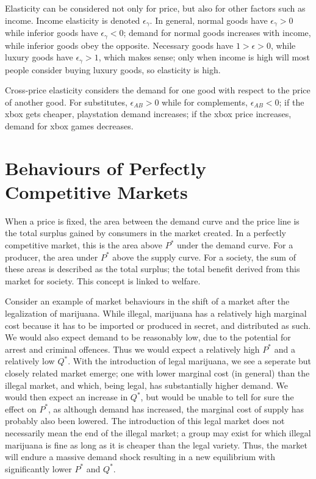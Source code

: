 \documentclass[12pt]{report}
\begin{document}
\begin{flushleft}
\bigskip
Elasticity can be considered not only for price, but also for other factors such as income. Income 
elasticity is denoted \(\epsilon_\gamma\). In general, normal goods have \(\epsilon_\gamma > 0\) while
inferior goods have \(\epsilon_\gamma < 0\); demand for normal goods increases with income, while inferior goods
obey the opposite. Necessary goods have \(1 > \epsilon > 0\), while luxury goods
have \(\epsilon_\gamma > 1\), which makes sense; only when income is high will most people consider buying
luxury goods, so elasticity is high.

\bigskip
Cross-price elasticity considers the demand for one good with respect to the price of another good. For
substitutes, \(\epsilon_{AB} > 0\) while for complements, \(\epsilon_{AB} < 0\); if the xbox gets 
cheaper, playstation demand increases; if the xbox price increases, demand for xbox games decreases.

\section*{Behaviours of Perfectly Competitive Markets}
When a price is fixed, the area between the demand curve and the price line is the total surplus gained
by consumers in the market created. In a perfectly competitive market, this is the area above \(P^*\) under
the demand curve. For a producer, the area under \(P^*\) above the supply curve. For a society, the sum of
these areas is described as the total surplus; the total benefit derived from this market for society. This
concept is linked to welfare.

\bigskip
Consider an example of market behaviours in the shift of a market after the legalization of marijuana.
While illegal, marijuana has a relatively high marginal cost because it has to be imported or produced 
in secret, and distributed as such. We would also expect demand to be reasonably low, due to the potential
for arrest and criminal offences. Thus we would expect a relatively high \(P^*\) and a relatively low \(Q^*\).
With the introduction of legal marijuana, we see a seperate but closely related market emerge; one with lower
marginal cost (in general) than the illegal market, and which, being legal, has substantially higher demand.
We would then expect an increase in \(Q^*\), but would be unable to tell for sure the effect on \(P^*\), as
although demand has increased, the marginal cost of supply has probably also been lowered. The introduction
of this legal market does not necessarily mean the end of the illegal market; a group may exist for which
illegal marijuana is fine as long as it is cheaper than the legal variety. Thus, the market will endure a 
massive demand shock resulting in a new equilibrium with significantly lower \(P^*\) and \(Q^*\).


\end{flushleft}
\end{document}

